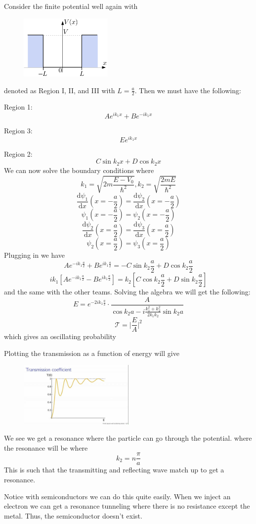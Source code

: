 Consider the finite potential well again with 
\begin{figure}[H]
	\centering
	\includegraphics[width=0.4\textwidth]{Figures/03.png}
	\caption{}
	\label{fig:}
\end{figure}

denoted as Region I, II, and III with \(L = \frac{a}{2}\). Then we must have the following:

Region 1:
\[
	Ae^{ik_1 x} + Be^{-ik_1 x} 
\] 

Region 3:
\[
	E e^{ik_1 x} 
\]

Region 2:
\[
	C \sin k_2 x + D \cos  k_2 x
\]
We can now solve the boundary conditions where
\[
	k_1 = \sqrt{2m\frac{E-V_0}{\hbar ^{2} }} , k_2 = \sqrt{\frac{2mE}{\hbar ^{2} }} 
\]
\[
	\frac{\mathrm{d}\psi _1 }{\mathrm{d}x} (x= -\frac{a}{2}) = \frac{\mathrm{d}\psi _2}{\mathrm{d}x} (x= -\frac{a}{2})
\]
\[
	\psi _1 (x=-\frac{a}{2}) = \psi _2 (x=-\frac{a}{2})
\]
\[
	\frac{\mathrm{d}\psi _2}{\mathrm{d}x} \left( x =\frac{a}{2} \right)  = \frac{\mathrm{d}\psi _3}{\mathrm{d}x} \left( x = \frac{a}{2} \right)  
\]
\[
	\psi _2 \left( x=\frac{a}{2} \right) = \psi _3 \left( x= \frac{a}{2} \right) 
\]
Plugging in we have 
\[
	A e^{-ik_1 \frac{a}{2}} + Be^{ik_1 \frac{a}{2}} = -C \sin k_2 \frac{a}{2} + D \cos  k_2 \frac{a}{2}
\]
\[
	ik_1 \left[  Ae^{-ik_1 \frac{a}{2}} - Be^{ik_1 \frac{a}{2}}   \right] = k_2 \left[  C \cos  k_2 \frac{a}{2} + D \sin  k_2 \frac{a}{2} \right] 
\]
and the same with the other teams. Solving the algebra we will get the following: 
\[
	E = e^{-2i k_1 \frac{a}{2}} \cdot \frac{A}{\cos  k_2 a - i \frac{k_1 ^{2}  + k_2 ^{2}  }{2k_1 k_2} \sin  k_2 a} 
\]
\[
	\mathcal{T} = \vert \frac{E}{A} \vert ^{2} 
\]
which gives an oscillating probability

Plotting the transmission as a function of energy will give	
\begin{figure}[H]
	\centering
	\includegraphics[width=0.5\textwidth]{Figures/06.jpg}
	\caption{}
	\label{fig:}
\end{figure}
We see we get a resonance where the particle can go through the potential. where the resonance will be where
\[
	k_2 = n \frac{\pi}{a}
\] 
This is such that the transmitting and reflecting wave match up to get a resonance. 
\begin{eg}
	Notice with semiconductors we can do this quite easily. When we inject an electron we can get a resonance tunneling where there is no resistance except the metal. Thus, the semiconductor doesn't exist. 
\end{eg}